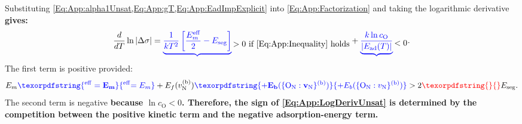 \documentclass[preprint,12pt,sort&compress]{elsarticle}
\newcommand{\?}{\stackrel{?}{=}}
\providecommand{\DIFaddtex}[1]{{\bf #1}} %
\providecommand{\DIFdeltex}[1]{} %
\providecommand{\DIFaddbegin}{\protect\color{blue}} %
\providecommand{\DIFaddend}{\protect\color{black}} %
\providecommand{\DIFdelbegin}{\protect\color{red}} %
\providecommand{\DIFdelend}{\protect\color{black}} %
\providecommand{\DIFadd}[1]{\texorpdfstring{\DIFaddtex{#1}}{#1}} %
\providecommand{\DIFdel}[1]{\texorpdfstring{\DIFdeltex{#1}}{}} %
\begin{document}
Substituting \cref{Eq:App:alpha1Unsat,Eq:App:gT,Eq:App:EadImpExplicit} into \cref{Eq:App:Factorization} and taking the logarithmic derivative \DIFdelbegin \DIFdel{:
}\DIFdelend \DIFaddbegin \DIFadd{gives:
}\DIFaddend \begin{equation}
\frac{d}{dT}\ln|\Delta \sigma| =
\DIFdelbegin %
\DIFdelend \DIFaddbegin \underbrace{ \frac{1}{kT^2} \left[ \frac{E_m^\mathrm{eff}}{2} - E_\text{seg} \right] }\DIFaddend _{\displaystyle > 0 \text{ if \cref{Eq:App:Inequality} holds}}
+ \DIFdelbegin %
\DIFdelend \DIFaddbegin \underbrace{ \frac{k\ln c_\text{O}}{|E_\text{ad}(T)|} }\DIFaddend _{\displaystyle < 0}.
\label{Eq:App:LogDerivUnsat}
\end{equation}
The first term is positive provided:
\begin{equation}
E_m\DIFaddbegin \DIFadd{^\mathrm{eff} = E_m }\DIFaddend + E_f(v_\text{N}^{(\text{b})}) \DIFaddbegin \DIFadd{+ E_b(\{\text{O}_\text{N}:v_\text{N}\}^{(\text{b})}) }\DIFaddend > 2 \DIFdelbegin \DIFdel{\,}\DIFdelend E_\text{seg}.
\label{Eq:App:Inequality}
\end{equation}
The second term is negative \DIFdelbegin \DIFdel{since $\ln c_\text{O} < 0$. The sign of the sum determines whether $|\Delta \sigma|$ is increasing or decreasing.
The inequality \cref{Eq:App:Inequality} is verified in \ref{App:Tpeak:Verification}, where it is shown to be satisfied with a margin of $\sim$2--2.5~eVfor all stoichiometric conditions. Furthermore, a numerical evaluation over the full physically relevant parameter domain ($T \in [800, 2500]$~K, $w_\text{O} \in [500, 3000]$~ppm, all three stoichiometries) confirms that the positive first term dominates the negative second term, so the sum in \cref{Eq:App:LogDerivUnsat} is strictly }\DIFdelend \DIFaddbegin \DIFadd{because $\ln c_\text{O}<0$. Therefore, the sign of \cref{Eq:App:LogDerivUnsat} is determined by the competition between the positive kinetic term and the negative adsorption-energy term.
}
\end{document}

